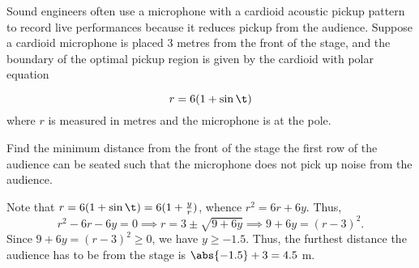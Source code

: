 \begin{problem}
    \begin{center}
    \end{center}

    Sound engineers often use a microphone with a cardioid acoustic pickup pattern to record live performances because it reduces pickup from the audience. Suppose a cardioid microphone is placed 3 metres from the front of the stage, and the boundary of the optimal pickup region is given by the cardioid with polar equation

    \[
        r = 6(1 + \sin \t)
    \]
    where $r$ is measured in metres and the microphone is at the pole.

    Find the minimum distance from the front of the stage the first row of the audience can be seated such that the microphone does not pick up noise from the audience.
\end{problem}
\begin{solution}
    Note that $r = 6(1 + \sin\t) = 6(1 + \frac{y}{r})$, whence $r^2 = 6r + 6y$. Thus,
    \[r^2 - 6r - 6y = 0 \implies r = 3 \pm \sqrt{9 + 6y} \implies 9 + 6y = (r-3)^2.\] Since $9 + 6y = (r-3)^2 \geq 0$, we have $y \geq -1.5$. Thus, the furthest distance the audience has to be from the stage is $\abs{-1.5} + 3 = 4.5$ m.
\end{solution}

